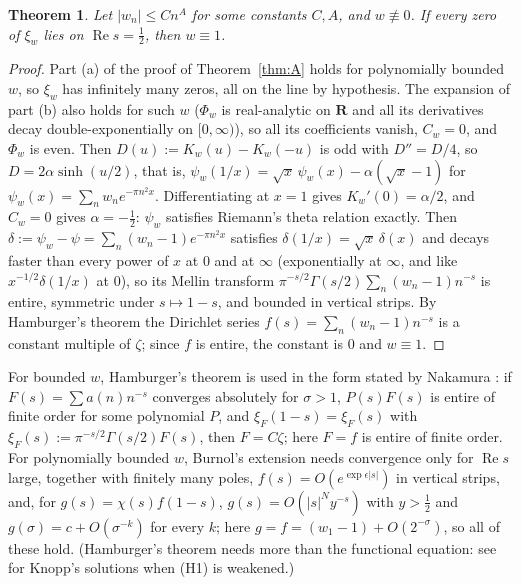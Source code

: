 \documentclass[11pt]{article}
\theoremstyle{plain}
\newtheorem{theorem}{Theorem}[section]
\theoremstyle{definition}
\theoremstyle{remark}
\newcommand{\R}{\mathbf{R}}
\newcommand{\re}{\operatorname{Re}}
\begin{document}
\begin{theorem}\label{thm:B}
Let $|w_n| \le Cn^A$ for some constants $C, A$, and $w \not\equiv 0$. If every
zero of $\xi_w$ lies on $\re s = \tfrac12$, then $w \equiv 1$.
\end{theorem}

\begin{proof}
Part (a) of the proof of Theorem~\ref{thm:A} holds for polynomially bounded $w$,
so $\xi_w$ has infinitely many zeros, all on the line by hypothesis. The
expansion of part (b) also holds for such $w$ ($\Phi_w$ is real-analytic on $\R$
and all its derivatives decay double-exponentially on $[0,\infty)$), so all its
coefficients vanish, $C_w = 0$, and $\Phi_w$ is even. Then
$D(u) := K_w(u) - K_w(-u)$ is odd with $D'' = D/4$, so $D = 2\alpha\sinh(u/2)$,
that is, $\psi_w(1/x) = \sqrt{x}\,\psi_w(x) - \alpha(\sqrt{x} - 1)$ for
$\psi_w(x) = \sum_n w_n e^{-\pi n^2 x}$. Differentiating at $x = 1$ gives
$K_w'(0) = \alpha/2$, and $C_w = 0$ gives $\alpha = -\tfrac12$: $\psi_w$
satisfies Riemann's theta relation exactly. Then
$\delta := \psi_w - \psi = \sum_n(w_n - 1)e^{-\pi n^2 x}$ satisfies
$\delta(1/x) = \sqrt{x}\,\delta(x)$ and decays faster than every power of $x$ at $0$ and at
$\infty$ (exponentially at $\infty$, and like $x^{-1/2}\delta(1/x)$ at $0$), so its Mellin transform $\pi^{-s/2}\Gamma(s/2)\sum_n(w_n - 1)n^{-s}$ is
entire, symmetric under $s \mapsto 1 - s$, and bounded in vertical strips. By
Hamburger's theorem \cite{Ham} the Dirichlet series
$f(s) = \sum_n(w_n - 1)n^{-s}$ is a constant multiple of $\zeta$; since $f$ is
entire, the constant is $0$ and $w \equiv 1$.
\end{proof}

For bounded $w$, Hamburger's theorem is used in the form stated by Nakamura
\cite[Theorem~D, p.~4]{Nak}: if $F(s) = \sum a(n)n^{-s}$ converges absolutely for
$\sigma > 1$, $P(s)F(s)$ is entire of finite order for some polynomial $P$, and
$\xi_F(1-s) = \xi_F(s)$ with $\xi_F(s) := \pi^{-s/2}\Gamma(s/2)F(s)$, then
$F = C\zeta$; here $F = f$ is entire of finite order. For polynomially bounded
$w$, Burnol's extension \cite[pp.~2--3, Corollaire~2]{Bur} needs convergence only
for $\re s$ large, together with finitely many poles, $f(s) = O(e^{\exp\epsilon|s|})$ in
vertical strips, and, for $g(s) = \chi(s)f(1-s)$, $g(s) = O(|s|^N y^{-s})$ with
$y > \tfrac12$ and $g(\sigma) = c + O(\sigma^{-k})$ for every $k$; here
$g = f = (w_1 - 1) + O(2^{-\sigma})$, so all of these hold. (Hamburger's theorem needs
more than the functional equation: see \cite[p.~4]{Nak} for Knopp's solutions when
(H1) is weakened.)
\end{document}
